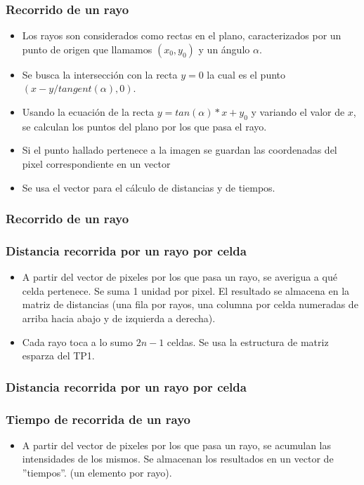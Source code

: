 \documentclass[11pt]{beamer}
\begin{document}
\begin{frame}
\frametitle{Recorrido de un rayo}
\begin{itemize}
\item Los rayos son considerados como rectas en el plano, caracterizados por un punto de origen que llamamos $(x_{0},y_{0})$ y un ángulo $\alpha$.
\item Se busca la intersección con la recta $y=0$ la cual es el punto $(x-y/tangent(\alpha),0)$.
\item Usando la ecuación de la recta $y=tan(\alpha)*x+y_{0}$ y variando el valor de $x$, se calculan los puntos del plano por los que pasa el rayo.
\item Si el punto hallado pertenece a la imagen se guardan las coordenadas del pixel correspondiente en un vector
\item Se usa el vector para el cálculo de distancias y de tiempos.
\end{itemize}
\end{frame}

\begin{frame}
\frametitle{Recorrido de un rayo}
\end{frame}



\begin{frame}
\frametitle{Distancia recorrida por un rayo por celda}
\begin{itemize}
\item A partir del vector de pixeles por los que pasa un rayo, se averigua a qué celda pertenece. Se suma 1 unidad por pixel. El resultado se almacena en la matriz de distancias (una fila por rayos, una columna por celda numeradas de arriba hacia abajo y de izquierda a derecha).
\item Cada rayo toca a lo sumo $2n-1$ celdas. Se usa la estructura de matriz esparza del TP1.
\end{itemize}
\end{frame}


\begin{frame}
\frametitle{Distancia recorrida por un rayo por celda}
\end{frame}


\begin{frame}
\frametitle{Tiempo de recorrida de un rayo}
\begin{itemize}
\item A partir del vector de pixeles por los que pasa un rayo, se acumulan las intensidades de los mismos. Se almacenan los resultados en un vector de ''tiempos''. (un elemento por rayo).
\end{itemize}
\end{frame}
\end{document}
